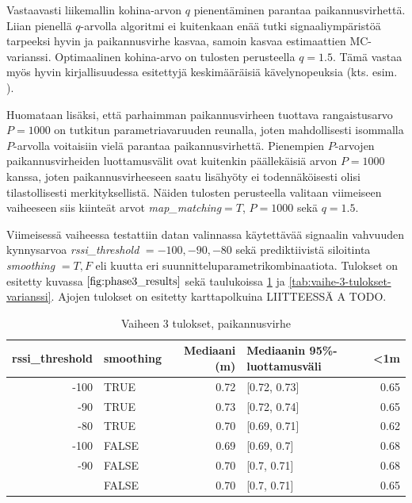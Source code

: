 \documentclass[
  12pt,
  a4paper, twoside]{book}
\begin{document}
Vastaavasti liikemallin kohina-arvon \(q\) pienentäminen parantaa paikannusvirhettä. Liian pienellä \(q\)-arvolla algoritmi ei kuitenkaan enää tutki signaaliympäristöä tarpeeksi hyvin ja paikannusvirhe kasvaa, samoin kasvaa estimaattien MC-varianssi. Optimaalinen kohina-arvo on tulosten perusteella \(q=1.5\). Tämä vastaa myös hyvin kirjallisuudessa esitettyjä keskimääräisiä kävelynopeuksia (kts. esim. \citep{Ho-2016}).

Huomataan lisäksi, että parhaimman paikannusvirheen tuottava rangaistusarvo \(P=1000\) on tutkitun parametriavaruuden reunalla, joten mahdollisesti isommalla \(P\)-arvolla voitaisiin vielä parantaa paikannusvirhettä. Pienempien \(P\)-arvojen paikannusvirheiden luottamusvälit ovat kuitenkin päällekäisiä arvon \(P=1000\) kanssa, joten paikannusvirheeseen saatu lisähyöty ei todennäköisesti olisi tilastollisesti merkityksellistä. Näiden tulosten perusteella valitaan viimeiseen vaiheeseen siis kiinteät arvot \emph{map\_matching}\(=T\), \(P=1000\) sekä \(q=1.5\).

Viimeisessä vaiheessa testattiin datan valinnassa käytettävää signaalin vahvuuden kynnysarvoa \emph{rssi\_threshold} \(={-100,-90,-80}\) sekä prediktiivistä siloitinta \emph{smoothing} \(={T,F}\) eli kuutta eri suunnitteluparametrikombinaatiota. Tulokset on esitetty kuvassa \(\ref{fig:phase3_results}\) sekä taulukoissa \ref{tab:vaihe-3-tulokset} ja \ref{tab:vaihe-3-tulokset-varianssi}. Ajojen tulokset on esitetty karttapolkuina LIITTEESSÄ A TODO.

\begin{table}

\caption{\label{tab:vaihe-3-tulokset}Vaiheen 3 tulokset, paikannusvirhe}
\centering
\begin{tabular}[t]{rlrlr}
\toprule
rssi\_threshold & smoothing & Mediaani (m) & Mediaanin 95\%-luottamusväli & <1m\\
\midrule
-100 & TRUE & 0.72 & {}[0.72, 0.73] & 0.65\\
-90 & TRUE & 0.73 & {}[0.72, 0.74] & 0.65\\
-80 & TRUE & 0.70 & {}[0.69, 0.71] & 0.62\\
-100 & FALSE & 0.69 & {}[0.69, 0.7] & 0.68\\
-90 & FALSE & 0.70 & {}[0.7, 0.71] & 0.68\\
\addlinespace
-80 & FALSE & 0.70 & {}[0.7, 0.71] & 0.65\\
\bottomrule
\end{tabular}
\end{table}
\end{document}
